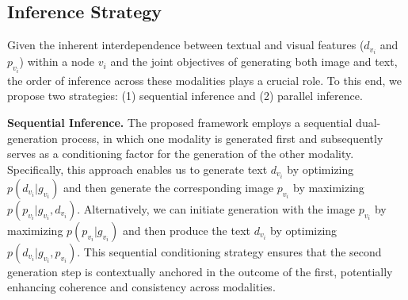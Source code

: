



\subsection{Inference Strategy}\label{sec:inference-strategy}
Given the inherent interdependence between textual and visual features ($d_{v_i}$ and $p_{v_i}$) within a node $v_i$ and the joint objectives of generating both image and text, the order of inference across these modalities plays a crucial role.
To this end, we propose two strategies: (1) sequential inference and (2) parallel inference.


\vspace{0.05in}
\noindent
\textbf{Sequential Inference.} 
The proposed framework employs a sequential dual-generation process, in which one modality is generated first and subsequently serves as a conditioning factor for the generation of the other modality.
Specifically, this approach enables us to generate text  $d_{v_i}$ by optimizing $p(d_{v_i}|g_{v_i})$ and then generate the corresponding image $p_{v_i}$ by maximizing $p(p_{v_i}|g_{v_i}, d_{v_i})$.
Alternatively, we can initiate generation with the image $p_{v_i}$ by maximizing $p(p_{v_i}|g_{v_i})$ and then produce the text $d_{v_i}$ by optimizing $p(d_{v_i}|g_{v_i}, p_{v_i})$.
This sequential conditioning strategy ensures that the second generation step is contextually anchored in the outcome of the first, potentially enhancing coherence and consistency across modalities.

